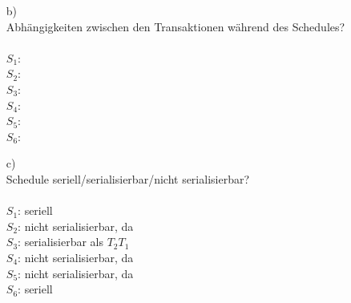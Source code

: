 \documentclass[a4paper,11pt,fleqn]{scrartcl}
\begin{document}
\begin{enumerate}
\begin{enumerate}
				\item[b)]\quad \\
				Abhängigkeiten zwischen den Transaktionen während des Schedules?\\
				\\
				$S_1$: \\
				$S_2$: \\
				$S_3$: \\
				$S_4$: \\
				$S_5$: \\
				$S_6$: 

				\item[c)]\quad \\
				Schedule seriell/serialisierbar/nicht serialisierbar?\\
				\\
				$S_1$: seriell\\
				$S_2$: nicht serialisierbar, da \\
				$S_3$: serialisierbar als $T_2 T_1$\\
				$S_4$: nicht serialisierbar, da \\
				$S_5$: nicht serialisierbar, da \\
				$S_6$: seriell
			\end{enumerate}


\end{enumerate}
\end{document}
